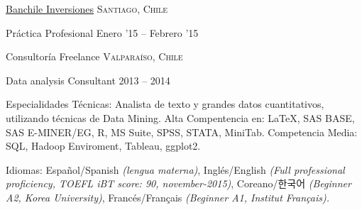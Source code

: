 \documentclass[10pt,a4paper]{article}
\begin{document}
\headedsection %
{\href{http://www.banchileinversiones.cl}{Banchile Inversiones}}
{\textsc{Santiago, Chile}} {

\headedsubsection %
{Práctica Profesional}
{Enero '15 -- Febrero '15}
{}}


\headedsection %
{Consultoría Freelance}
{\textsc{Valparaíso, Chile}} {

\headedsubsection %
{Data analysis Consultant}
{2013 -- 2014}
{}}





\inlineheadsection %
{Especialidades Técnicas:}
{Analista de texto y grandes datos cuantitativos, utilizando técnicas de Data Mining. Alta Compentencia en: \LaTeX, SAS BASE, SAS E-MINER/EG, R, MS Suite, SPSS, STATA, MiniTab. Competencia Media: SQL, Hadoop Enviroment, Tableau, ggplot2.}

\inlineheadsection
{}
{}
\inlineheadsection %
{Idiomas:}
{Español/Spanish \textit{(lengua materna)}, Inglés/English \textit{(Full professional proficiency, TOEFL iBT score: 90, november-2015)}, Coreano/한국어 \textit{(Beginner A2, Korea University)}, Francés/Français \textit{(Beginner A1, Institut Français).}}
\end{document}
